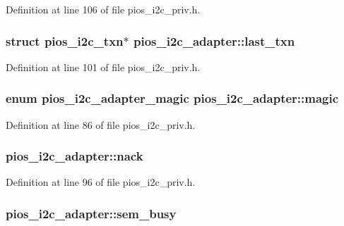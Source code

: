 Definition at line 106 of file pios\-\_\-i2c\-\_\-priv.\-h.

\hypertarget{structpios__i2c__adapter_af283735c4934e46748f2461bf338811e}{
\subsubsection[{last\-\_\-txn}]{\setlength{\rightskip}{0pt plus 5cm}struct {\bf pios\-\_\-i2c\-\_\-txn}$\ast$ pios\-\_\-i2c\-\_\-adapter\-::last\-\_\-txn}}\label{structpios__i2c__adapter_af283735c4934e46748f2461bf338811e}


Definition at line 101 of file pios\-\_\-i2c\-\_\-priv.\-h.

\hypertarget{structpios__i2c__adapter_a07891f689e89b36732affa16c1c3bf94}{
\subsubsection[{magic}]{\setlength{\rightskip}{0pt plus 5cm}enum {\bf pios\-\_\-i2c\-\_\-adapter\-\_\-magic} pios\-\_\-i2c\-\_\-adapter\-::magic}}\label{structpios__i2c__adapter_a07891f689e89b36732affa16c1c3bf94}


Definition at line 86 of file pios\-\_\-i2c\-\_\-priv.\-h.

\hypertarget{structpios__i2c__adapter_a22998be1ea282fe23fcd44c2b559c987}{
\subsubsection[{nack}]{ pios\-\_\-i2c\-\_\-adapter\-::nack}}\label{structpios__i2c__adapter_a22998be1ea282fe23fcd44c2b559c987}


Definition at line 96 of file pios\-\_\-i2c\-\_\-priv.\-h.

\hypertarget{structpios__i2c__adapter_ae21b610793f476b61cedafa82fffc493}{
\subsubsection[{sem\-\_\-busy}]{ pios\-\_\-i2c\-\_\-adapter\-::sem\-\_\-busy}}\label{structpios__i2c__adapter_ae21b610793f476b61cedafa82fffc493}


